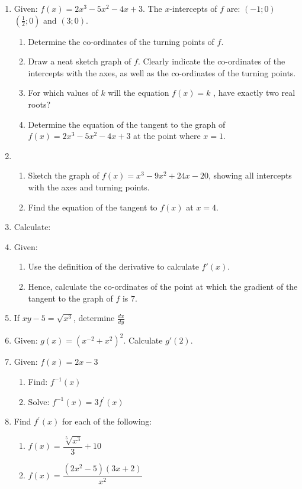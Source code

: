 \begin{eocexercises}{}
\begin{enumerate}
\item{Given: $f(x) = 2x^3 - 5x^2 - 4x + 3$.
The $x$-intercepts of $f$ are: $(-1;0)$ $(\frac{1}{2};0)$ and $(3;0)$.
\begin{enumerate}
\item{Determine the co-ordinates of the turning points of $f$.}
\item{Draw a neat sketch graph of $f$. Clearly indicate the co-ordinates of the intercepts with the axes, as well as the co-ordinates of the turning points.}
\item{For which values of $k$ will the equation $f(x) = k$ , have exactly two real roots?}
\item{Determine the equation of the tangent to the graph of
$f(x) = 2x^3 - 5x^2 - 4x + 3$ at the point where $x = 1$.}
\end{enumerate}}

\item{\begin{enumerate}
\item{Sketch the graph of $f(x) = x^3 - 9x^2 + 24x - 20$, showing all intercepts with the axes and turning points.}
\item{Find the equation of the tangent to $f(x)$ at $x=4$.}
\end{enumerate}}

\item{Calculate:
}
\item{Given:
\begin{enumerate}
\item{Use the definition of the derivative to calculate $f'(x)$.}
\item{Hence, calculate the co-ordinates of the point at which the gradient of the tangent to the graph of $f$ is $7$.}
\end{enumerate}
}

\item{If $xy-5=\sqrt{x^3}$, determine $\frac{dx}{dy}$}

\item{Given: $g(x)=(x^{-2}+x^2)^2$.
Calculate $g'(2)$.}


\item{Given: $f(x) = 2x - 3$
\begin{enumerate}
\item{Find: $f^{-1}(x)$}
\item{Solve: $f^{-1}(x) = 3f^{\prime}(x)$}
\end{enumerate}}

\item{Find $f^{\prime}(x)$ for each of the following:
\begin{enumerate}
\item{$f(x) = \dfrac{\sqrt[5]{x^3}}{3} + 10$}
\item{$f(x) = \dfrac{(2x^2 - 5)(3x + 2)}{x^2}$}
\end{enumerate}}


\end{enumerate}
\end{eocexercises}
